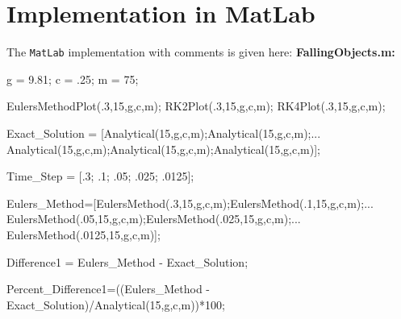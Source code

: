 \documentclass[12pt]{article}
\begin{document}
\section{Implementation in MatLab}\label{sec::appendix}
The \texttt{MatLab} implementation with comments is given here:\newline\newline
\textbf{FallingObjects.m:}
\begin{verbatimtab}

g = 9.81;   %
c = .25;    %
m = 75;     %

EulersMethodPlot(.3,15,g,c,m); %
RK2Plot(.3,15,g,c,m);          %
RK4Plot(.3,15,g,c,m);          %


Exact_Solution = [Analytical(15,g,c,m);Analytical(15,g,c,m);...
                Analytical(15,g,c,m);Analytical(15,g,c,m);Analytical(15,g,c,m)];

Time_Step = [.3; .1; .05; .025; .0125];


Eulers_Method=[EulersMethod(.3,15,g,c,m);EulersMethod(.1,15,g,c,m);...
     EulersMethod(.05,15,g,c,m);EulersMethod(.025,15,g,c,m);...
     EulersMethod(.0125,15,g,c,m)];

Difference1 = Eulers_Method - Exact_Solution;

Percent_Difference1=((Eulers_Method - Exact_Solution)/Analytical(15,g,c,m))*100;


\end{verbatimtab}
\end{document}
